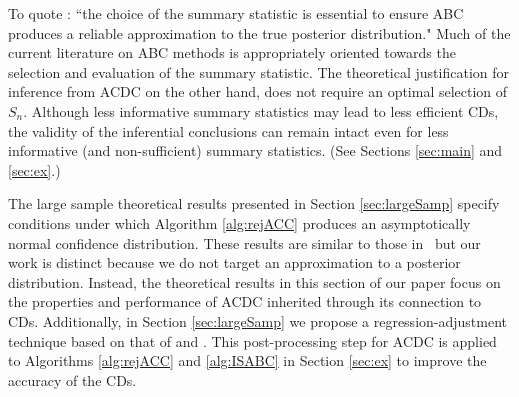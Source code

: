 To quote \cite[]{marquette_statistics_2021}: ``the choice of the summary statistic is essential to ensure ABC produces a reliable approximation to the true posterior distribution." Much of the current literature on ABC methods is appropriately oriented towards the selection and evaluation of the summary statistic. 
The theoretical justification for inference from ACDC on the other hand, does not require an optimal selection of $S_n$. Although less informative summary statistics may lead to less efficient CDs, the validity of the inferential conclusions can remain intact even for less informative (and non-sufficient) summary statistics. (See Sections \ref{sec:main} and \ref{sec:ex}.)


The large sample theoretical results presented in Section \ref{sec:largeSamp} specify conditions under which Algorithm \ref{alg:rejACC} produces an asymptotically normal confidence distribution. These results are similar to those in~\cite{Li2017} but our work is distinct because we do not target an approximation to a posterior distribution. Instead, the theoretical results in this section of our paper focus on the properties and performance of ACDC inherited through its connection to CDs. Additionally, in Section \ref{sec:largeSamp} we propose a regression-adjustment technique based on that of \cite{Li2017} and \cite{Blum2010}. This post-processing step for ACDC is applied to Algorithms \ref{alg:rejACC} and \ref{alg:ISABC} in Section \ref{sec:ex} to improve the accuracy of the CDs.

